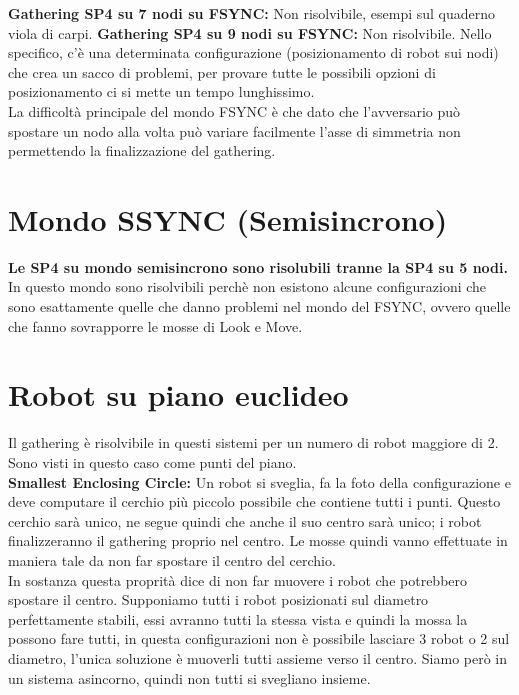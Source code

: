 \textbf{Gathering SP4 su 7 nodi su FSYNC:} Non risolvibile, esempi sul quaderno
viola di carpi. \textbf{Gathering SP4 su 9 nodi su FSYNC:} Non risolvibile.
Nello specifico, c'è una determinata configurazione (posizionamento di robot sui
nodi) che crea un sacco di problemi, per provare tutte le possibili opzioni di
posizionamento ci si mette un tempo lunghissimo.\\ La difficoltà principale del
mondo FSYNC è che dato che l'avversario può spostare un nodo alla volta può
variare facilmente l'asse di simmetria non permettendo la finalizzazione del
gathering.

\section{Mondo SSYNC (Semisincrono)}
\textbf{Le SP4 su mondo semisincrono sono risolubili tranne la SP4 su 5 nodi.}
In questo mondo sono risolvibili perchè non esistono alcune configurazioni che
sono esattamente quelle che danno problemi nel mondo del FSYNC, ovvero quelle
che fanno sovrapporre le mosse di Look e Move.

\section{Robot su piano euclideo}
Il gathering è risolvibile in questi sistemi per un numero di robot maggiore di
2. Sono visti in questo caso come punti del piano.\\

\textbf{Smallest Enclosing
    Circle:} Un robot si sveglia, fa la foto della configurazione e deve computare
il cerchio più piccolo possibile che contiene tutti i punti. Questo cerchio sarà
unico, ne segue quindi che anche il suo centro sarà unico; i robot
finalizzeranno il gathering proprio nel centro. Le mosse quindi vanno effettuate
in maniera tale da non far spostare il centro del cerchio.\\

In sostanza questa proprità dice di non far muovere i robot che potrebbero
spostare il centro. Supponiamo tutti i robot posizionati sul diametro
perfettamente stabili, essi avranno tutti la stessa vista e quindi la mossa la
possono fare tutti, in questa configurazioni non è possibile lasciare 3 robot o
2 sul diametro, l'unica soluzione è muoverli tutti assieme verso il centro.
Siamo però in un sistema asincorno, quindi non tutti si svegliano insieme.

